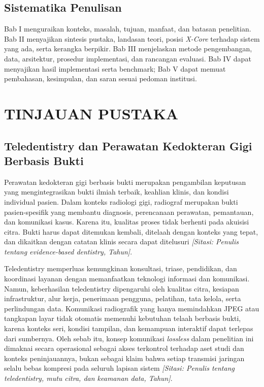 \documentclass[12pt,a4paper,oneside]{report}
\newcommand{\sitasi}[1]{\textit{[Sitasi: #1]}}
\newcommand{\xcore}{\textit{X-Core}}
\begin{document}
\section{Sistematika Penulisan}

Bab I menguraikan konteks, masalah, tujuan, manfaat, dan batasan penelitian. Bab II menyajikan sintesis pustaka, landasan teori, posisi \xcore{} terhadap sistem yang ada, serta kerangka berpikir. Bab III menjelaskan metode pengembangan, data, arsitektur, prosedur implementasi, dan rancangan evaluasi. Bab IV dapat menyajikan hasil implementasi serta benchmark; Bab V dapat memuat pembahasan, kesimpulan, dan saran sesuai pedoman institusi.

\chapter{TINJAUAN PUSTAKA}
\label{bab:tinjauan-pustaka}

\section{Teledentistry dan Perawatan Kedokteran Gigi Berbasis Bukti}

Perawatan kedokteran gigi berbasis bukti merupakan pengambilan keputusan yang mengintegrasikan bukti ilmiah terbaik, keahlian klinis, dan kondisi individual pasien. Dalam konteks radiologi gigi, radiograf merupakan bukti pasien-spesifik yang membantu diagnosis, perencanaan perawatan, pemantauan, dan komunikasi kasus. Karena itu, kualitas proses tidak berhenti pada akuisisi citra. Bukti harus dapat ditemukan kembali, ditelaah dengan konteks yang tepat, dan dikaitkan dengan catatan klinis secara dapat ditelusuri \sitasi{Penulis tentang evidence-based dentistry, Tahun}.

Teledentistry memperluas kemungkinan konsultasi, triase, pendidikan, dan koordinasi layanan dengan memanfaatkan teknologi informasi dan komunikasi. Namun, keberhasilan teledentistry dipengaruhi oleh kualitas citra, kesiapan infrastruktur, alur kerja, penerimaan pengguna, pelatihan, tata kelola, serta perlindungan data. Komunikasi radiografik yang hanya memindahkan JPEG atau tangkapan layar tidak otomatis memenuhi kebutuhan telaah berbasis bukti, karena konteks seri, kondisi tampilan, dan kemampuan interaktif dapat terlepas dari sumbernya. Oleh sebab itu, konsep komunikasi \textit{lossless} dalam penelitian ini dimaknai secara operasional sebagai akses terkontrol terhadap aset studi dan konteks peninjauannya, bukan sebagai klaim bahwa setiap transmisi jaringan selalu bebas kompresi pada seluruh lapisan sistem \sitasi{Penulis tentang teledentistry, mutu citra, dan keamanan data, Tahun}.
\end{document}

